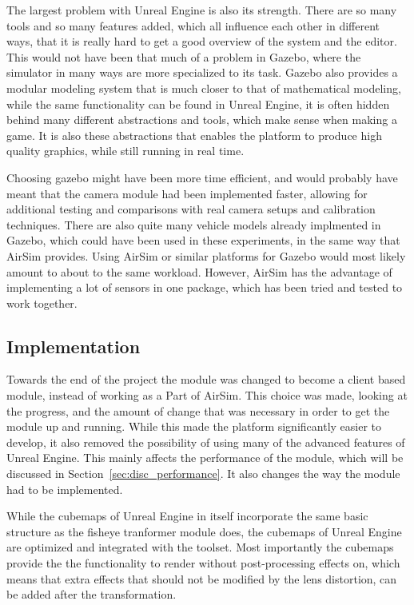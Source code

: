 The largest problem with Unreal Engine is also its strength. There are so many tools and so many features added, which all influence each other in different ways, that it is really hard to get a good overview of the system and the editor. This would not have been that much of a problem in Gazebo, where the simulator in many ways are more specialized to its task. Gazebo also provides a modular modeling system that is much closer to that of mathematical modeling, while the same functionality can be found in Unreal Engine, it is often hidden behind many different abstractions and tools, which make sense when making a game. It is also these abstractions that enables the platform to produce high quality graphics, while still running in real time.

Choosing gazebo might have been more time efficient, and would probably have meant that the camera module had been implemented faster, allowing for additional testing and comparisons with real camera setups and calibration techniques. There are also quite many vehicle models already implmented in Gazebo, which could have been used in these experiments, in the same way that AirSim provides. Using AirSim or similar platforms for Gazebo would most likely amount to about to the same workload. However, AirSim has the advantage of implementing a lot of sensors in one package, which has been tried and tested to work together.

\subsection{Implementation}

Towards the end of the project the module was changed to become a client based module, instead of working as a Part of AirSim. This choice was made, looking at the progress, and the amount of change that was necessary in order to get the module up and running. While this made the platform significantly easier to develop, it also removed the possibility of using many of the advanced features of Unreal Engine. This mainly affects the performance of the module, which will be discussed in Section~\ref{sec:disc_performance}. It also changes the way the module had to be implemented.

While the cubemaps of Unreal Engine in itself incorporate the same basic structure as the fisheye tranformer module does, the cubemaps of Unreal Engine are optimized and integrated with the toolset. Most importantly the cubemaps provide the the functionality to render without post-processing effects on, which means that extra effects that should not be modified by the lens distortion, can be added after the transformation.

